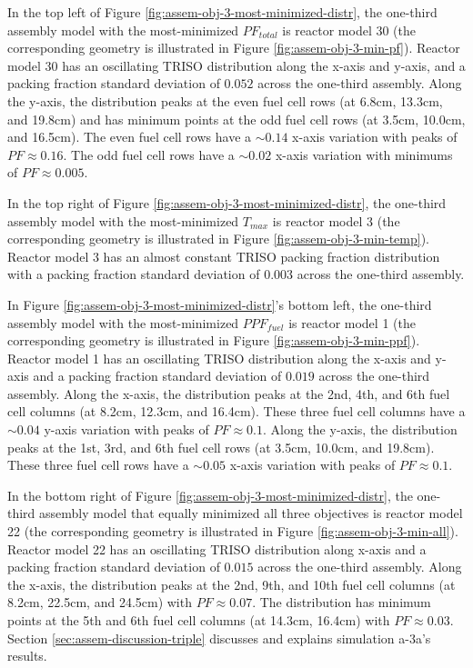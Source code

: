 In the top left of Figure \ref{fig:assem-obj-3-most-minimized-distr}, the one-third
assembly model with the most-minimized $PF_{total}$ is reactor model 30 
(the corresponding geometry is illustrated in Figure \ref{fig:assem-obj-3-min-pf}). 
Reactor model 30 has an oscillating TRISO distribution along the 
x-axis and y-axis, and a packing fraction standard deviation of $0.052$ across the 
one-third assembly. 
Along the y-axis, the distribution peaks at the even fuel cell rows (at 6.8cm, 
13.3cm, and 19.8cm) and has minimum points at the odd fuel cell rows (at 3.5cm, 
10.0cm, and 16.5cm). 
The even fuel cell rows have a ${\sim}0.14$ x-axis variation with peaks of 
$PF\approx0.16$. 
The odd fuel cell rows have a ${\sim}0.02$ x-axis variation with minimums of 
$PF\approx0.005$. 

In the top right of Figure \ref{fig:assem-obj-3-most-minimized-distr}, the one-third 
assembly model with the most-minimized $T_{max}$ is reactor model 3 (the corresponding geometry is illustrated 
in Figure \ref{fig:assem-obj-3-min-temp}). 
Reactor model 3 has an almost constant TRISO packing fraction distribution with 
a packing fraction standard deviation of $0.003$ across the one-third assembly. 

In Figure \ref{fig:assem-obj-3-most-minimized-distr}'s bottom left, the 
one-third assembly model with the most-minimized $PPF_{fuel}$ is reactor model 1 
(the corresponding geometry is illustrated in Figure \ref{fig:assem-obj-3-min-ppf}).
Reactor model 1 has an oscillating TRISO distribution along the 
x-axis and y-axis and a packing fraction standard deviation of $0.019$ across the 
one-third assembly.
Along the x-axis, the distribution peaks at the 2nd, 4th, and 6th fuel cell columns (at 
8.2cm, 12.3cm, and 16.4cm). 
These three fuel cell columns have a ${\sim}0.04$ y-axis variation with peaks of 
$PF\approx0.1$. 
Along the y-axis, the distribution peaks at the 1st, 3rd, and 6th fuel cell rows (at 
3.5cm, 10.0cm, and 19.8cm).
These three fuel cell rows have a ${\sim}0.05$ x-axis variation with peaks of 
$PF\approx0.1$. 

In the bottom right of Figure \ref{fig:assem-obj-3-most-minimized-distr}, the 
one-third assembly model that equally minimized all three objectives is reactor 
model 22 (the corresponding geometry is illustrated in Figure \ref{fig:assem-obj-3-min-all}).
Reactor model 22 has an oscillating TRISO distribution along x-axis and a packing 
fraction standard deviation of $0.015$ across the one-third assembly. 
Along the x-axis, the distribution peaks at the 2nd, 9th, and 10th fuel cell columns 
(at 8.2cm, 22.5cm, and 24.5cm) with $PF\approx0.07$.
The distribution has minimum points at the 5th and 6th fuel cell columns (at 14.3cm, 
16.4cm) with $PF\approx0.03$.
Section \ref{sec:assem-discussion-triple} discusses and explains simulation a-3a's 
results.

